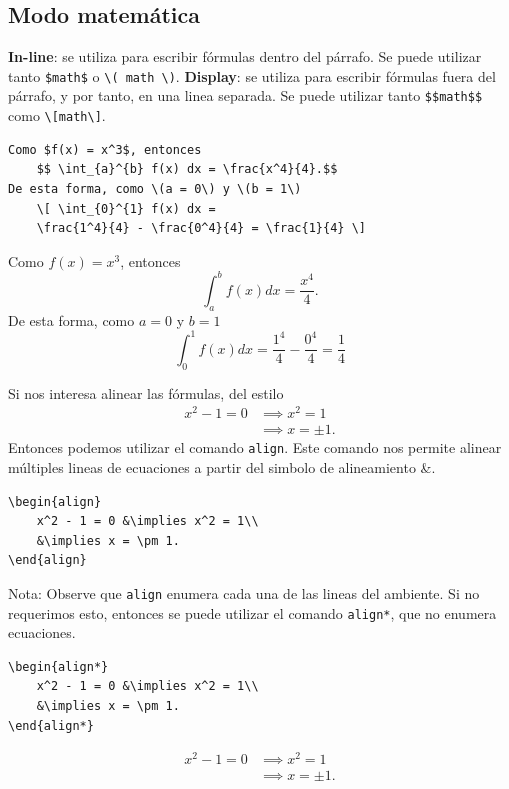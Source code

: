 \documentclass[../notes.tex]{subfiles}
\begin{document}
    \subsection{Modo matemática}

        \textbf{In-line}: se utiliza para escribir fórmulas dentro del párrafo. Se puede utilizar tanto \texttt{\$math\$} o \texttt{\textbackslash ( math \textbackslash )}.
        \textbf{Display}: se utiliza para escribir fórmulas fuera del párrafo, y por tanto, en una linea separada. Se puede utilizar tanto \texttt{\$\$math\$\$} como \texttt{\textbackslash[math\textbackslash]}.
        
        \begin{verbatim}
Como $f(x) = x^3$, entonces
    $$ \int_{a}^{b} f(x) dx = \frac{x^4}{4}.$$
De esta forma, como \(a = 0\) y \(b = 1\)
    \[ \int_{0}^{1} f(x) dx = 
    \frac{1^4}{4} - \frac{0^4}{4} = \frac{1}{4} \]
        \end{verbatim}
Como $f(x) = x^3$, entonces
    $$ \int_{a}^{b} f(x) dx = \frac{x^4}{4}.$$
De esta forma, como \(a = 0\) y \(b = 1\)
    \[ \int_{0}^{1} f(x) dx = 
    \frac{1^4}{4} - \frac{0^4}{4} = \frac{1}{4} \]
    
        Si nos interesa alinear las fórmulas, del estilo
            \begin{align}
            	x^2 - 1 = 0 &\implies x^2 = 1\\
            	&\implies x = \pm 1.
            \end{align}
        Entonces podemos utilizar el comando \texttt{align}. Este comando nos permite alinear múltiples lineas de ecuaciones a partir del simbolo de alineamiento \&.
            \begin{verbatim}
\begin{align}
    x^2 - 1 = 0 &\implies x^2 = 1\\
    &\implies x = \pm 1.
\end{align}
            \end{verbatim}

        Nota: Observe que \texttt{align} enumera cada una de las lineas del ambiente. Si no requerimos esto, entonces se puede utilizar el comando \texttt{align*}, que no enumera ecuaciones.
        
            \begin{verbatim}
\begin{align*}
    x^2 - 1 = 0 &\implies x^2 = 1\\
    &\implies x = \pm 1.
\end{align*}
            \end{verbatim}
    \begin{align*}
        x^2 - 1 = 0 &\implies x^2 = 1\\
        &\implies x = \pm 1.
    \end{align*}
    
\end{document}
